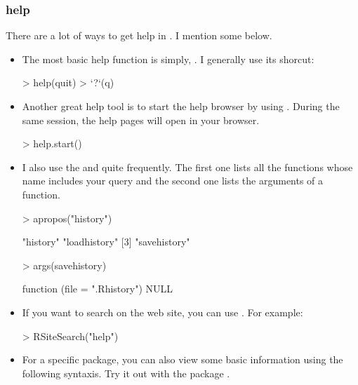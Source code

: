 \begin{frame}
  \frametitle{ help}
  There are a lot of ways to get help in . I mention some below.
  \begin{itemize}
  \item The most basic help function is simply, . I generally use its shorcut: 
\begin{Schunk}
\begin{Sinput}
> help(quit)
> `?`(q)
\end{Sinput}
\end{Schunk}
  \item Another great help tool is to start the help browser by using . During the same session, the help pages will open in your browser.
\begin{Schunk}
\begin{Sinput}
> help.start()
\end{Sinput}
\end{Schunk}
  \item I also use the  and  quite frequently. The first one lists all the functions whose name includes your query and the second one lists the arguments of a function.
\begin{Schunk}
\begin{Sinput}
> apropos("history")
\end{Sinput}
\begin{Soutput}
[1] "history"     "loadhistory"
[3] "savehistory"
\end{Soutput}
\begin{Sinput}
> args(savehistory)
\end{Sinput}
\begin{Soutput}
function (file = ".Rhistory") 
NULL
\end{Soutput}
\end{Schunk}
  \item If you want to search on the  web site, you can use . For example:
\begin{Schunk}
\begin{Sinput}
> RSiteSearch("help")
\end{Sinput}
\end{Schunk}
  \item For a specific package, you can also view some basic information using the following syntaxis. Try it out with the package .
\begin{Schunk}

\end{Schunk}
\end{itemize}
\end{frame}
